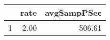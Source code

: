 \begin{table}[h]
\centering
\begin{tabular}{rrr}
  \hline
 & rate & avgSampPSec \\ 
  \hline
1 & 2.00 & 506.61 \\ 
   \hline
\end{tabular}
\end{table}
